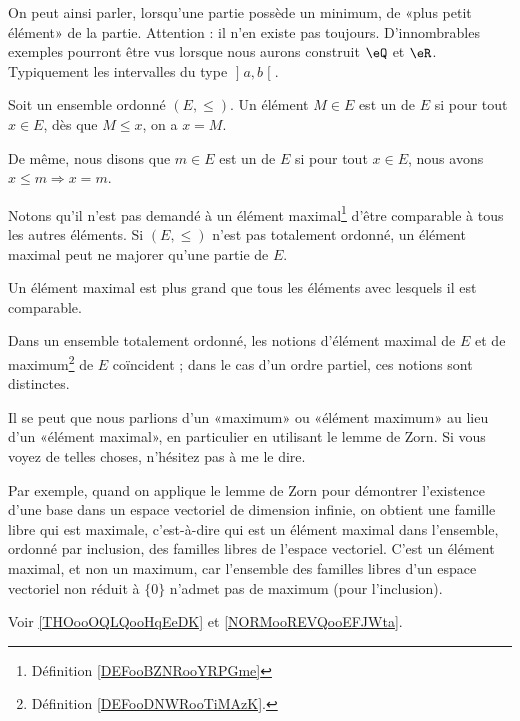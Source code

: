 \begin{normaltext}\label{NORMooPlusPetitElement}
	On peut ainsi parler, lorsqu'une partie possède un minimum, de «plus petit élément» de la partie. Attention : il n'en existe pas toujours. D'innombrables exemples pourront être vus lorsque nous aurons construit \( \eQ\) et \( \eR\). Typiquement les intervalles du type \( \mathopen] a , b \mathclose[\).
\end{normaltext}


\begin{definition}        \label{DEFooBZNRooYRPGme}
	Soit un ensemble ordonné \( (E,\leq)\). Un élément \(M\in E\) est un  de \( E\) si pour tout \( x\in E\), dès que \( M\leq x\), on a \(x=M\).

	De même, nous disons que \( m\in E\) est un  de \( E\) si pour tout \( x\in E\), nous avons \( x\leq m\Rightarrow x=m\).
\end{definition}

\begin{normaltext}    \label{NORMooVHIBooJAOsou}
	Notons qu'il n'est pas demandé à un élément maximal\footnote{Définition \ref{DEFooBZNRooYRPGme}} d'être comparable à tous les autres éléments. Si \( (E,\leq)\) n'est pas totalement ordonné, un élément maximal peut ne majorer qu'une partie de \( E\).

	Un élément maximal est plus grand que tous les éléments avec lesquels il est comparable.

	Dans un ensemble totalement ordonné, les notions d'élément maximal de \( E\) et de maximum\footnote{Définition \ref{DEFooDNWRooTiMAzK}.} de \( E\) coïncident ; dans le cas d'un ordre partiel, ces notions sont distinctes.

	Il se peut que nous parlions d'un «maximum» ou «élément maximum»  au lieu d'un «élément maximal», en particulier en utilisant le lemme de Zorn. Si vous voyez de telles choses, n'hésitez pas à me le dire.

	Par exemple, quand on applique le lemme de Zorn pour démontrer l'existence d'une base dans un espace vectoriel de dimension infinie, on obtient une famille libre qui est maximale, c'est-à-dire qui est un élément maximal dans l'ensemble, ordonné par inclusion, des familles libres de l'espace vectoriel. C'est un élément maximal, et non un maximum, car l'ensemble des familles libres d'un espace vectoriel non réduit à \( \{ 0 \}\) n'admet pas de maximum (pour l'inclusion).

	Voir \ref{THOooOQLQooHqEeDK} et \ref{NORMooREVQooEFJWta}.		%
\end{normaltext}

